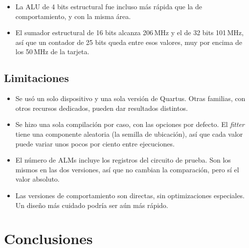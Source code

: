 \documentclass[11pt,letterpaper]{article}
\begin{document}
\begin{itemize}
    \item La ALU de 4 bits estructural fue incluso más rápida que la de comportamiento, y con la
    misma área.
    \item El sumador estructural de 16 bits alcanza 206\,MHz y el de 32 bits 101\,MHz, así que un
    contador de 25 bits queda entre esos valores, muy por encima de los 50\,MHz de la tarjeta.
\end{itemize}

\subsection{Limitaciones}

\begin{itemize}
    \item Se usó un solo dispositivo y una sola versión de Quartus. Otras familias, con otros
    recursos dedicados, pueden dar resultados distintos.
    \item Se hizo una sola compilación por caso, con las opciones por defecto. El \emph{fitter}
    tiene una componente aleatoria (la semilla de ubicación), así que cada valor puede variar unos
    pocos por ciento entre ejecuciones.
    \item El número de ALMs incluye los registros del circuito de prueba. Son los mismos en las dos
    versiones, así que no cambian la comparación, pero sí el valor absoluto.
    \item Las versiones de comportamiento son directas, sin optimizaciones especiales. Un diseño
    más cuidado podría ser aún más rápido.
\end{itemize}

\section{Conclusiones}
\end{document}
